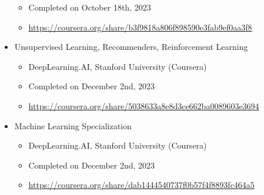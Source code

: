 \documentclass[12pt, oneside, a4paper]{article}
\begin{document}
\begin{itemize}
\begin{itemize}
              \item Completed on October 18th, 2023
              \item \url{https://coursera.org/share/b3f9818a806f898590e3fab9ef0aa3f8}
          \end{itemize}
    \item Unsupervised Learning, Recommenders, Reinforcement Learning
          \begin{itemize}
              \item DeepLearning.AI, Stanford University (Coursera)
              \item Completed on December 2nd, 2023
              \item \url{https://coursera.org/share/5038633a8e8d3ce662ba0089603e3694} 
          \end{itemize}
    \item Machine Learning Specialization
          \begin{itemize}
              \item DeepLearning.AI, Stanford University (Coursera)
              \item Completed on December 2nd, 2023
              \item \url{https://coursera.org/share/dab1444540737f0b57f4f8893fc464a5}
          \end{itemize}
\end{itemize}
\end{document}
